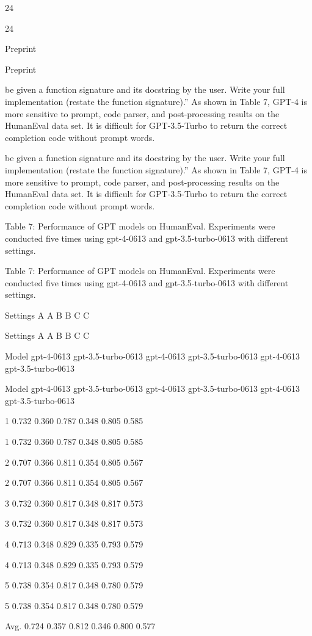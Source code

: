 \documentclass[12pt]{article}
\begin{document}
24


24


Preprint


Preprint


be given a function signature and its docstring by the user. Write your full implementation (restate
the function signature).” As shown in Table 7, GPT-4 is more sensitive to prompt, code parser, and
post-processing results on the HumanEval data set. It is difficult for GPT-3.5-Turbo to return the
correct completion code without prompt words.


be given a function signature and its docstring by the user. Write your full implementation (restate
the function signature).” As shown in Table 7, GPT-4 is more sensitive to prompt, code parser, and
post-processing results on the HumanEval data set. It is difficult for GPT-3.5-Turbo to return the
correct completion code without prompt words.


Table 7: Performance of GPT models on HumanEval. Experiments were conducted five times
using gpt-4-0613 and gpt-3.5-turbo-0613 with different settings.


Table 7: Performance of GPT models on HumanEval. Experiments were conducted five times
using gpt-4-0613 and gpt-3.5-turbo-0613 with different settings.


Settings
A
A
B
B
C
C


Settings
A
A
B
B
C
C


Model
gpt-4-0613
gpt-3.5-turbo-0613
gpt-4-0613
gpt-3.5-turbo-0613
gpt-4-0613
gpt-3.5-turbo-0613


Model
gpt-4-0613
gpt-3.5-turbo-0613
gpt-4-0613
gpt-3.5-turbo-0613
gpt-4-0613
gpt-3.5-turbo-0613


1
0.732
0.360
0.787
0.348
0.805
0.585


1
0.732
0.360
0.787
0.348
0.805
0.585


2
0.707
0.366
0.811
0.354
0.805
0.567


2
0.707
0.366
0.811
0.354
0.805
0.567


3
0.732
0.360
0.817
0.348
0.817
0.573


3
0.732
0.360
0.817
0.348
0.817
0.573


4
0.713
0.348
0.829
0.335
0.793
0.579


4
0.713
0.348
0.829
0.335
0.793
0.579


5
0.738
0.354
0.817
0.348
0.780
0.579


5
0.738
0.354
0.817
0.348
0.780
0.579


Avg.
0.724
0.357
0.812
0.346
0.800
0.577
\end{document}
